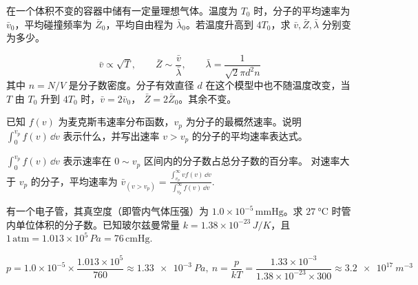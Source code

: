 \begin{exercise}
在一个体积不变的容器中储有一定量理想气体。温度为 \(T_0\) 时，分子的平均速率为 \(\bar v_0\)，平均碰撞频率为 \(\bar Z_0\)，平均自由程为 \(\bar\lambda_0\)。若温度升高到 \(4T_0\)，求 \(\bar v,\bar Z,\bar\lambda\) 分别变为多少。
\end{exercise}

\begin{solution}
 \[\bar v\propto\sqrt{T},\qquad \bar Z\sim \frac{\bar v}{\bar\lambda},\qquad \bar\lambda=\frac{1}{\sqrt2\pi d^2 n}\] 
其中 \(n=N/V\) 是分子数密度。分子有效直径 \(d\) 在这个模型中也不随温度改变，当 \(T\) 由 \(T_0\) 升到 \(4T_0\) 时，\(\bar v=2\bar v_0\)， \(\bar Z=2\bar Z_0\)。其余不变。
\end{solution}



\begin{exercise}[用麦克斯韦分布函数表示速率区间和条件平均速率]
已知 \(f(v)\) 为麦克斯韦速率分布函数，\(v_p\) 为分子的最概然速率。说明
 \(\int_0^{v_p}f(v)\,\dd v\) 表示什么，并写出速率 \(v>v_p\) 的分子的平均速率表达式。
\end{exercise}

\begin{solution}
 \(\int_0^{v_p}f(v)\,\dd v\) 表示速率在 \(0\sim v_p\) 区间内的分子数占总分子数的百分率。
对速率大于 \(v_p\) 的分子，平均速率为 \(\displaystyle\bar v_{(v>v_p)} =\frac{\int_{v_p}^{\infty}v f(v)\,\dd v} {\int_{v_p}^{\infty}f(v)\,\dd v}.\) 
\end{solution}

\begin{exercise}
有一个电子管，其真空度（即管内气体压强）为 \(1.0\times10^{-5}\,\mathrm{mmHg}\)。求 \(\SI{27}{\celsius}\) 时管内单位体积的分子数。已知玻尔兹曼常量 \(k=1.38\times10^{-23}\,\si{J/K}\)，且
 \(1\,\mathrm{atm}=1.013\times10^5\,\si{Pa}=76\,\mathrm{cmHg}.\) 
\end{exercise}

\begin{solution}
\[
p=1.0\times10^{-5}\times \frac{1.013\times10^5}{760}
\approx \SI{1.33e-3}{Pa},~n=\frac{p}{kT}=\frac{1.33\times10^{-3}}{1.38\times10^{-23}\times300} \approx \SI{3.2e17}{m^{-3}}
\]
\end{solution}
